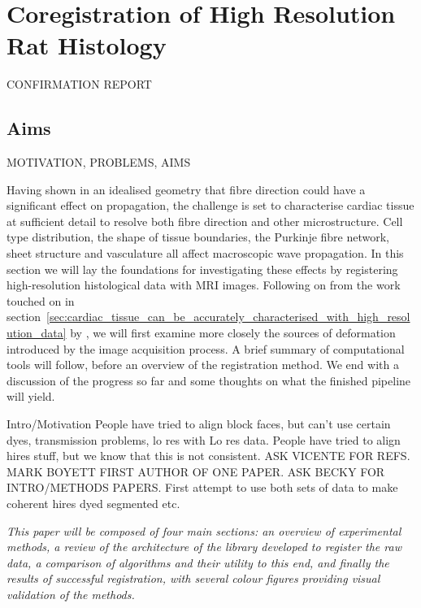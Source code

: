 \chapter{Coregistration of High Resolution Rat Histology}
\dblspace
\begin{quote}{\em }\end{quote}

CONFIRMATION REPORT
\section{Aims} %
\label{sec:aims}

  MOTIVATION, PROBLEMS, AIMS
  
  Having shown in an idealised geometry that fibre direction could have a significant effect on propagation, the challenge is set to characterise cardiac tissue at sufficient detail to resolve both fibre direction and other microstructure. Cell type distribution, the shape of tissue boundaries, the Purkinje fibre network, sheet structure and vasculature all affect macroscopic wave propagation. In this section we will lay the foundations for investigating these effects by registering high-resolution histological data with MRI images. Following on from the work touched on in section~\ref{sec:cardiac_tissue_can_be_accurately_characterised_with_high_resolution_data} by \cite{Mansoori2007}, we will first examine more closely the sources of deformation introduced by the image acquisition process. A brief summary of computational tools will follow, before an overview of the registration method. We end with a discussion of the progress so far and some thoughts on what the finished pipeline will yield.
  
  
  
  Intro/Motivation
  People have tried to align block faces, but can't use certain dyes, transmission problems, lo res with Lo res data.
  People have tried to align hires stuff, but we know that this is not consistent.
  ASK VICENTE FOR REFS. MARK BOYETT FIRST AUTHOR OF ONE PAPER. ASK BECKY FOR INTRO/METHODS PAPERS.
  First attempt to use both sets of data to make coherent hires dyed segmented etc.
  
  \emph{This paper will be composed of four main sections: an overview of experimental methods, a review of the architecture of the library developed to register the raw data, a comparison of algorithms and their utility to this end, and finally the results of successful registration, with several colour figures providing visual validation of the methods.}
  
